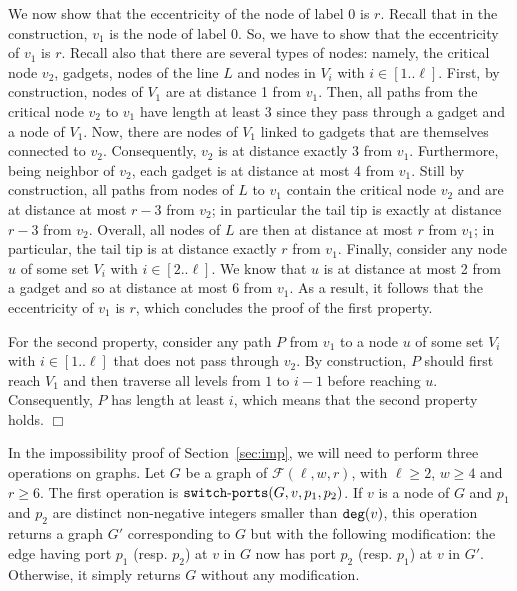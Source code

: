 \documentclass[11pt]{article}
\newcommand{\qed}{\hfill $\Box$ \bigbreak}
\newenvironment{proof}{\noindent {\bf Proof.}}{\qed}
\begin{document}
\begin{proof}
 We now show that the eccentricity of the node of label 0 is
 $r$. Recall that in the construction, $v_1$ is the node of label
 0. So, we have to show that the eccentricity of $v_1$ is $r$. Recall
 also that there are several types of nodes: namely, the critical node
 $v_2$, gadgets, nodes of the line $L$ and nodes in $V_i$ with $i \in
 [1..\ell]$.
First, by construction, nodes of $V_1$ are at distance 1 from $v_1$.
  Then, all paths from the critical node $v_2$ to $v_1$ have length at
  least 3 since they pass through a gadget and a node of $V_1$. Now,
  there are nodes of $V_1$ linked to gadgets that are themselves
  connected to $v_2$. Consequently, $v_2$ is at distance exactly 3
  from $v_1$. Furthermore, being neighbor of $v_2$, each gadget is at
  distance at most 4 from $v_1$.
Still by construction, all paths from nodes of $L$ to $v_1$ contain
  the critical node $v_2$ and are at distance at most $r-3$ from
  $v_2$; in particular the tail tip is exactly at distance $r-3$ from
  $v_2$. Overall, all nodes of $L$ are then at distance at most $r$
  from $v_1$; in particular, the tail tip is at distance exactly $r$
  from $v_1$.
Finally, consider any node $u$ of some set $V_i$ with $i \in
   [2..\ell]$. We know that $u$ is at distance at most 2 from a gadget
   and so at distance at most 6 from $v_1$.
As a result, it follows that the eccentricity of $v_1$ is $r$, which concludes the proof of the first property.

  For the second property, consider any path $P$ from $v_1$ to a node $u$ of some
  set $V_i$ with $i \in [1..\ell]$ that does not pass through $v_2$.
  By construction, $P$ should first reach $V_1$ and then
traverse all levels from $1$ to
  $i-1$ before reaching $u$. Consequently, $P$ has length at least $i$, which means that the second property holds.
\end{proof}



In the impossibility proof of Section~\ref{sec:imp}, we will need to perform three operations on graphs. Let $G$ be a graph of $\mathcal{F}(\ell,w,r)$, with $\ell\geq 2$, $w\geq 4$ and $r\geq 6$. The first operation is ${\tt switch\mbox{-}ports}(G,v,p_1,p_2)$. If $v$ is a node of $G$ and $p_1$ and $p_2$ are distinct non-negative integers smaller than ${\tt deg}(v)$, this operation returns a graph $G'$ corresponding to $G$ but with the following modification: the edge having port $p_1$ (resp. $p_2$) at $v$ in $G$ now has port $p_2$ (resp. $p_1$) at $v$ in $G'$. Otherwise, it simply returns $G$ without any modification.
\end{document}

